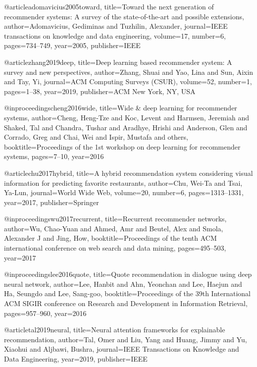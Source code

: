 @article{adomavicius2005toward,
  title={Toward the next generation of recommender systems: A survey of the state-of-the-art and possible extensions},
  author={Adomavicius, Gediminas and Tuzhilin, Alexander},
  journal={IEEE transactions on knowledge and data engineering},
  volume={17},
  number={6},
  pages={734--749},
  year={2005},
  publisher={IEEE}
}



@article{zhang2019deep,
  title={Deep learning based recommender system: A survey and new perspectives},
  author={Zhang, Shuai and Yao, Lina and Sun, Aixin and Tay, Yi},
  journal={ACM Computing Surveys (CSUR)},
  volume={52},
  number={1},
  pages={1--38},
  year={2019},
  publisher={ACM New York, NY, USA}
}

@inproceedings{cheng2016wide,
  title={Wide \& deep learning for recommender systems},
  author={Cheng, Heng-Tze and Koc, Levent and Harmsen, Jeremiah and Shaked, Tal and Chandra, Tushar and Aradhye, Hrishi and Anderson, Glen and Corrado, Greg and Chai, Wei and Ispir, Mustafa and others},
  booktitle={Proceedings of the 1st workshop on deep learning for recommender systems},
  pages={7--10},
  year={2016}
}

@article{chu2017hybrid,
  title={A hybrid recommendation system considering visual information for predicting favorite restaurants},
  author={Chu, Wei-Ta and Tsai, Ya-Lun},
  journal={World Wide Web},
  volume={20},
  number={6},
  pages={1313--1331},
  year={2017},
  publisher={Springer}
}

@inproceedings{wu2017recurrent,
  title={Recurrent recommender networks},
  author={Wu, Chao-Yuan and Ahmed, Amr and Beutel, Alex and Smola, Alexander J and Jing, How},
  booktitle={Proceedings of the tenth ACM international conference on web search and data mining},
  pages={495--503},
  year={2017}
}

@inproceedings{lee2016quote,
  title={Quote recommendation in dialogue using deep neural network},
  author={Lee, Hanbit and Ahn, Yeonchan and Lee, Haejun and Ha, Seungdo and Lee, Sang-goo},
  booktitle={Proceedings of the 39th International ACM SIGIR conference on Research and Development in Information Retrieval},
  pages={957--960},
  year={2016}
}

@article{tal2019neural,
  title={Neural attention frameworks for explainable recommendation},
  author={Tal, Omer and Liu, Yang and Huang, Jimmy and Yu, Xiaohui and Aljbawi, Bushra},
  journal={IEEE Transactions on Knowledge and Data Engineering},
  year={2019},
  publisher={IEEE}
}

